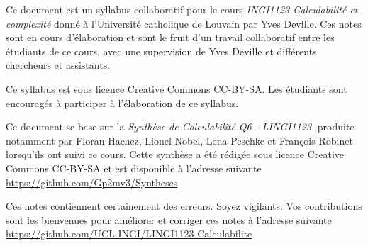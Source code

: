 
Ce document est un syllabus collaboratif pour le cours \emph{INGI1123 Calculabilité et complexité}  donné à l'Université catholique de Louvain par Yves Deville.  Ces notes sont en cours d'élaboration et sont le fruit d'un travail collaboratif entre les étudiants de ce cours, avec une supervision de Yves Deville et différents chercheurs et assistants.

Ce syllabus est sous licence Creative Commons CC-BY-SA.  Les étudiants sont encouragés à participer à l'élaboration de ce syllabus.

Ce document se base sur la \emph{Synthèse de Calculabilité Q6 - LINGI1123}, produite notamment par Floran Hachez, Lionel Nobel, Lena Peschke et François Robinet lorsqu'ils ont suivi ce cours.  Cette synthèse a été rédigée sous licence Creative Commons CC-BY-SA et est disponible à l’adresse suivante
\url{https://github.com/Gp2mv3/Syntheses}

Ces notes contiennent certainement des erreurs.  Soyez vigilants.  Vos contributions sont les bienvenues pour améliorer et corriger ces notes à l'adresse suivante
\url{https://github.com/UCL-INGI/LINGI1123-Calculabilite}
